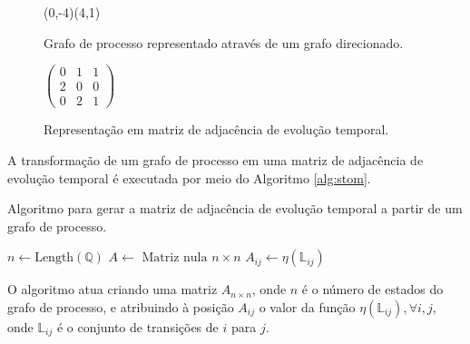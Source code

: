 \documentclass[12pt,a4paper]{article}
\let\vState=\origState
\begin{document}
\begin{figure}[ht]
\begin{minipage}[b]{0.5\linewidth}
\begin{center}
\begin{VCPicture}{(0,-4)(4,1)}
\vState[1]{(0,0)}{A} \vState[2]{(4,0)}{B}
\vState[3]{(2,-2)}{C}
  
 
\end{VCPicture}
\caption{Grafo de processo representado através de um grafo direcionado.}
\label{fig:semigraph}
\end{center}
\end{minipage}
\hspace{0.5cm}
\begin{minipage}[b]{0.5\linewidth}
\begin{center}
\begin{math}
\begin{pmatrix}
0 & 1 & 1 \\
2 & 0 & 0 \\
0 & 2 & 1
\end{pmatrix}
\end{math}
\caption{Representação em matriz de adjacência de evolução temporal.}
\label{fig:iadjm}
\end{center}
\end{minipage}
\end{figure}

A transformação de um grafo de processo em uma matriz de adjacência
de evolução temporal é executada por meio do Algoritmo \ref{alg:stom}.

\begin{algorithm}
\caption{Algoritmo para gerar a matriz de adjacência de evolução temporal a partir
de um grafo de processo.}
\label{alg:stom}
\begin{algorithmic}
\STATE $n \leftarrow \mbox{Length}(\mathbb{Q})$ 
\STATE $A \leftarrow \mbox{ Matriz nula } n \times n$
        \STATE $A_{ij} \leftarrow \eta(\mathbb{\mathbb{L}}_{ij})$
    \ENDIF
\ENDFOR
\end{algorithmic}
\end{algorithm}

O algoritmo atua criando uma matriz $A_{n \times n}$, onde $n$ é o número
de estados do grafo de processo, e atribuindo à posição $A_{ij}$ o valor
da função $\eta(\mathbb{L}_{ij}),\forall i,j$, onde $\mathbb{L}_{ij}$
é o conjunto de transições de $i$ para $j$.
\end{document}
